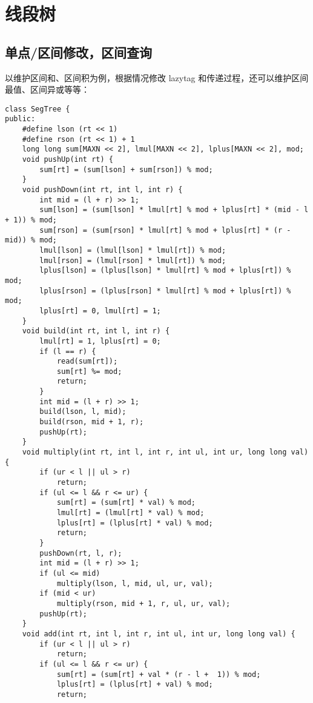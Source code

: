 \section{线段树}

\subsection{单点/区间修改，区间查询}

\par 以维护区间和、区间积为例，根据情况修改 lazytag 和传递过程，还可以维护区间最值、区间异或等等：

\begin{verbatim}
class SegTree {
public:
    #define lson (rt << 1)          
    #define rson (rt << 1) + 1      
    long long sum[MAXN << 2], lmul[MAXN << 2], lplus[MAXN << 2], mod;
    void pushUp(int rt) {
        sum[rt] = (sum[lson] + sum[rson]) % mod;
    }
    void pushDown(int rt, int l, int r) {
        int mid = (l + r) >> 1;
        sum[lson] = (sum[lson] * lmul[rt] % mod + lplus[rt] * (mid - l + 1)) % mod;
        sum[rson] = (sum[rson] * lmul[rt] % mod + lplus[rt] * (r - mid)) % mod;
        lmul[lson] = (lmul[lson] * lmul[rt]) % mod;
        lmul[rson] = (lmul[rson] * lmul[rt]) % mod;
        lplus[lson] = (lplus[lson] * lmul[rt] % mod + lplus[rt]) % mod;
        lplus[rson] = (lplus[rson] * lmul[rt] % mod + lplus[rt]) % mod;
        lplus[rt] = 0, lmul[rt] = 1;
    }
    void build(int rt, int l, int r) {
        lmul[rt] = 1, lplus[rt] = 0;
        if (l == r) {
            read(sum[rt]);
            sum[rt] %= mod;
            return;
        }
        int mid = (l + r) >> 1;
        build(lson, l, mid);
        build(rson, mid + 1, r);
        pushUp(rt);
    }
    void multiply(int rt, int l, int r, int ul, int ur, long long val) {
        if (ur < l || ul > r)
            return;
        if (ul <= l && r <= ur) {
            sum[rt] = (sum[rt] * val) % mod;
            lmul[rt] = (lmul[rt] * val) % mod;
            lplus[rt] = (lplus[rt] * val) % mod;
            return;
        }
        pushDown(rt, l, r);
        int mid = (l + r) >> 1;
        if (ul <= mid)
            multiply(lson, l, mid, ul, ur, val);
        if (mid < ur)
            multiply(rson, mid + 1, r, ul, ur, val);
        pushUp(rt);
    }
    void add(int rt, int l, int r, int ul, int ur, long long val) {
        if (ur < l || ul > r)
            return;
        if (ul <= l && r <= ur) {
            sum[rt] = (sum[rt] + val * (r - l +  1)) % mod;
            lplus[rt] = (lplus[rt] + val) % mod;
            return;

\end{verbatim}

